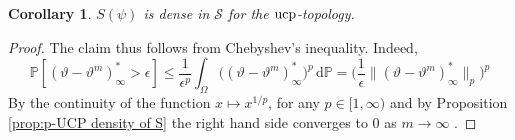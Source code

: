 \documentclass[11pt,a4paper,twoside,openany]{report}
\numberwithin{equation}{section}
\newcommand{\diff}{\mathrm{d}}
\theoremstyle{plain} %
\newtheorem{corollary}[theorem]{Corollary}
\theoremstyle{definition} %
\theoremstyle{remark} %
\begin{document}
\begin{corollary}\label{cor:p-UCP density of S}
    \(S(\psi)\) is dense in \(\mathcal{S}\) for the \(\rm{ucp}\)-topology.
\end{corollary}
\begin{proof}
   The claim thus follows from Chebyshev's inequality. Indeed,
    \begin{equation*}
        \mathbb{P}[(\vartheta-\vartheta^m)_{\infty}^*>\epsilon]\leq\frac{1}{\epsilon^p}\int_{\Omega}\big((\vartheta-\vartheta^m)_{\infty}^*\big)^p\,\diff \mathbb{P}=\bigg(\frac{1}{\epsilon}\lVert (\vartheta-\vartheta^m)_{\infty}^*\rVert_p\bigg)^p
    \end{equation*}
By the continuity of the function \(x\mapsto x^{1/p}\), for any \(p\in[1,\infty)\) and by Proposition \ref{prop:p-UCP density of S} the right hand side converges to \(0\) as \(m\to\infty\) .  
\end{proof}
\end{document}
